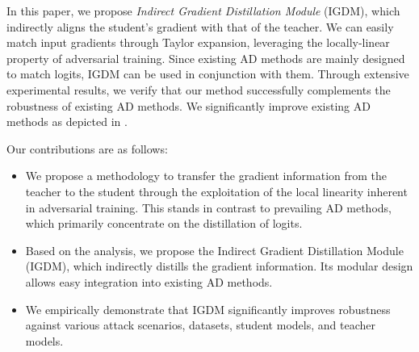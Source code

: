 \documentclass{article} %
\begin{document}
In this paper, we propose \textit{Indirect Gradient Distillation Module} (IGDM), which indirectly aligns the student's gradient with that of the teacher.
We can easily match input gradients through Taylor expansion, leveraging the locally-linear property of adversarial training.
Since existing AD methods are mainly designed to match logits, IGDM can be used in conjunction with them.
Through extensive experimental results, we verify that our method successfully complements the robustness of existing AD methods.
We significantly improve existing AD methods as depicted in .

Our contributions are as follows:
\begin{itemize}
\item We propose a methodology to transfer the gradient information from the teacher to the student through the exploitation of the local linearity inherent in adversarial training.
This stands in contrast to prevailing AD methods, which primarily concentrate on the distillation of logits.
\item Based on the analysis, we propose the Indirect Gradient Distillation Module (IGDM), which indirectly distills the gradient information. Its modular design allows easy integration into existing AD methods.
\item We empirically demonstrate that IGDM significantly improves robustness against various attack scenarios, datasets, student models, and teacher models.
\end{itemize}
\end{document}
